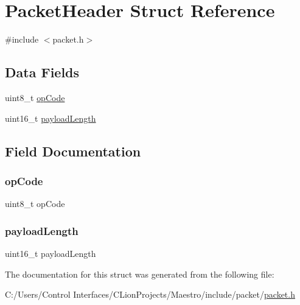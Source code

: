 \hypertarget{struct_packet_header}{}\section{Packet\+Header Struct Reference}
\label{struct_packet_header}


{\ttfamily \#include $<$packet.\+h$>$}

\subsection*{Data Fields}
\begin{DoxyCompactItemize}
\item 
uint8\+\_\+t \hyperlink{struct_packet_header_af6f534a870fc994581b099784fdd00b6}{op\+Code}
\item 
uint16\+\_\+t \hyperlink{struct_packet_header_a7f194dbba8b46ce01fdf18d10664af09}{payload\+Length}
\end{DoxyCompactItemize}


\subsection{Field Documentation}
\mbox{\label{struct_packet_header_af6f534a870fc994581b099784fdd00b6}} 
\subsubsection{\texorpdfstring{op\+Code}{opCode}}
{\footnotesize\ttfamily uint8\+\_\+t op\+Code}

\mbox{\label{struct_packet_header_a7f194dbba8b46ce01fdf18d10664af09}} 
\subsubsection{\texorpdfstring{payload\+Length}{payloadLength}}
{\footnotesize\ttfamily uint16\+\_\+t payload\+Length}



The documentation for this struct was generated from the following file\+:\begin{DoxyCompactItemize}
\item 
C\+:/\+Users/\+Control Interfaces/\+C\+Lion\+Projects/\+Maestro/include/packet/\hyperlink{packet_8h}{packet.\+h}\end{DoxyCompactItemize}
